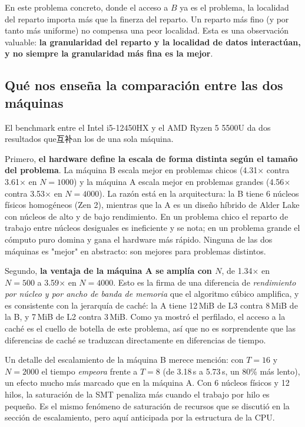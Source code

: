 En este problema concreto, donde el acceso a $B$ ya es el problema, la localidad del reparto importa más que la finerza del reparto. Un reparto más fino (y por tanto más uniforme) no compensa una peor localidad. Esta es una observación valuable: \textbf{la granularidad del reparto y la localidad de datos interactúan, y no siempre la granularidad más fina es la mejor}.

\subsection{Qué nos enseña la comparación entre las dos máquinas}

El benchmark entre el Intel i5-12450HX y el AMD Ryzen 5 5500U da dos resultados que互补an los de una sola máquina.

Primero, \textbf{el hardware define la escala de forma distinta según el tamaño del problema}. La máquina B escala mejor en problemas chicos (4.31$\times$ contra 3.61$\times$ en $N=1000$) y la máquina A escala mejor en problemas grandes (4.56$\times$ contra 3.53$\times$ en $N=4000$). La razón está en la arquitectura: la B tiene 6 núcleos físicos homogéneos (Zen 2), mientras que la A es un diseño híbrido de Alder Lake con núcleos de alto y de bajo rendimiento. En un problema chico el reparto de trabajo entre núcleos desiguales es ineficiente y se nota; en un problema grande el cómputo puro domina y gana el hardware más rápido. Ninguna de las dos máquinas es "mejor" en abstracto: son mejores para problemas distintos.

Segundo, \textbf{la ventaja de la máquina A se amplía con $N$}, de 1.34$\times$ en $N=500$ a 3.59$\times$ en $N=4000$. Esto es la firma de una diferencia de \emph{rendimiento por núcleo y por ancho de banda de memoria} que el algoritmo cúbico amplifica, y es consistente con la jerarquía de caché: la A tiene 12\,MiB de L3 contra 8\,MiB de la B, y 7\,MiB de L2 contra 3\,MiB. Como ya mostró el perfilado, el acceso a la caché es el cuello de botella de este problema, así que no es sorprendente que las diferencias de caché se traduzcan directamente en diferencias de tiempo.

Un detalle del escalamiento de la máquina B merece mención: con $T=16$ y $N=2000$ el tiempo \emph{empeora} frente a $T=8$ (de 3.18\,s a 5.73\,s, un 80\% más lento), un efecto mucho más marcado que en la máquina A. Con 6 núcleos físicos y 12 hilos, la saturación de la SMT penaliza más cuando el trabajo por hilo es pequeño. Es el mismo fenómeno de saturación de recursos que se discutió en la sección de escalamiento, pero aquí anticipada por la estructura de la CPU.

